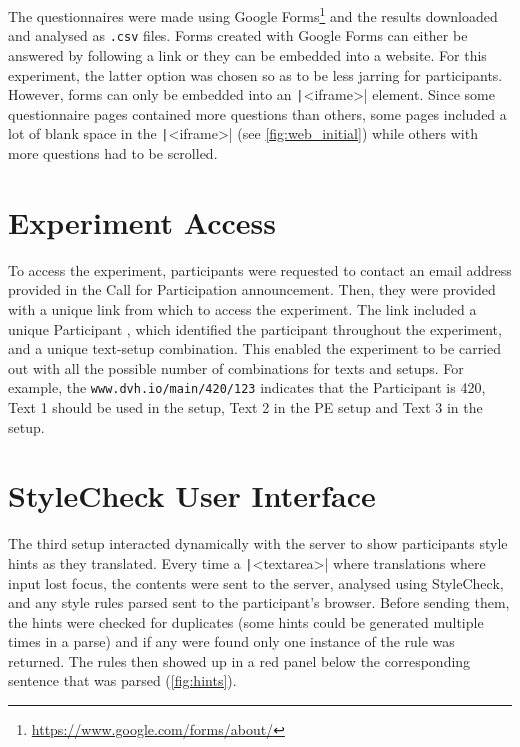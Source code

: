 The questionnaires were made using Google Forms\footnote{\url{https://www.google.com/forms/about/}} and the results downloaded and analysed as \texttt{.csv} files. Forms created with Google Forms can either be answered by following a link or they can be embedded into a website. For this experiment, the latter option was chosen so as to be less jarring for participants. However, forms can only be embedded into an \texttt|<iframe>| element. Since some questionnaire pages contained more questions than others, some pages included a lot of blank space in the \texttt|<iframe>| (see \autoref{fig:web_initial}) while others with more questions had to be scrolled.


\section{Experiment Access}
\label{sec:access}

\noindent To access the experiment, participants were requested to contact an email address provided in the Call for Participation announcement. Then, they were provided with a unique link from which to access the experiment. The link  included a unique Participant , which identified the participant throughout the experiment, and a unique text-setup combination. This enabled the experiment to be carried out with all the possible number of combinations for texts and setups. For example, the  \texttt{www.dvh.io/main/420/123} indicates that the Participant  is 420, Text 1 should be used in the \scratch setup, Text 2 in the \ac{PE} setup and Text 3 in the \style setup.


\section{StyleCheck User Interface}
\label{sec:hint_ui}

\noindent The third setup interacted dynamically with the server to show participants style hints as they translated. Every time a \texttt|<textarea>| where translations where input lost focus, the contents were sent to the server, analysed using StyleCheck, and any style rules parsed sent to the participant's browser. Before sending them, the hints were checked for duplicates (some hints could be generated multiple times in a parse) and if any were found only one instance of the rule was returned. The rules then showed up in a red panel below the corresponding sentence that was parsed (\autoref{fig:hints}).

